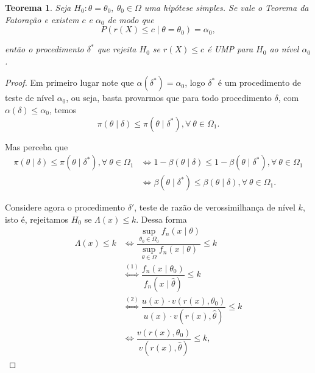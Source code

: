 \documentclass{article}
\newtheorem{theorem}{Teorema}
\begin{document}
\begin{theorem}\label{teo3}
    Seja $H_0 : \theta = \theta_0, ~\theta_0 \in \Omega$ uma hipótese simples. Se vale o Teorema da Fatoração e existem $c$ e $\alpha_0$ de modo que
    \[P(r(X) \leq c \mid \theta = \theta_0) = \alpha_0,\]
    
    \noindent então o procedimento $\delta^*$ que rejeita $H_0$ se $r(X) \leq c$ é UMP para $H_0$ ao nível $\alpha_0$.
\end{theorem}

\begin{proof}
    Em primeiro lugar note que $\alpha(\delta^*) = \alpha_0$, logo $\delta^*$ é um procedimento de teste de nível $\alpha_0$, ou seja, basta provarmos que para todo procedimento $\delta$, com $\alpha(\delta) \leq \alpha_0$, temos
    \[\pi(\theta \mid \delta) \leq \pi(\theta \mid \delta^*), \forall ~\theta \in \Omega_1.\]
    
    Mas perceba que
    \begin{equation*}
        \begin{split}
            \pi(\theta \mid \delta) \leq \pi(\theta \mid \delta^*), \forall ~\theta \in \Omega_1 & \iff 1 - \beta(\theta \mid \delta) \leq 1 - \beta(\theta \mid \delta^*), \forall ~\theta \in \Omega_1 \\
            & \iff \beta(\theta \mid \delta^*) \leq \beta(\theta \mid \delta), \forall ~\theta \in \Omega_1.
        \end{split}
    \end{equation*}
    
    Considere agora o procedimento $\delta'$, teste de razão de verossimilhança de nível $k$, isto é, rejeitamos $H_0$ se $\Lambda(x) \leq k$. Dessa forma
    \begin{equation*}
        \begin{split}
            \Lambda(x) \leq k & \iff \dfrac{\sup_{\theta_0 \in \Omega_0} f_n(x \mid \theta)}{\sup_{\theta \in \Omega} f_n(x \mid \theta)} \leq k \\
            & \overset{(1)}{\iff} \dfrac{f_n\left(x \mid \theta_0\right)}{f_n\left(x \mid \hat{\theta}\right)} \leq k \\
            & \overset{(2)}{\iff} \dfrac{u(x)\cdot v\left(r(x), \theta_0\right)}{u(x)\cdot v\left(r(x), \hat{\theta}\right)} \leq k \\
            & \iff \dfrac{v\left(r(x), \theta_0\right)}{v\left(r(x), \hat{\theta}\right)} \leq k,
        \end{split}
    \end{equation*}
    

\end{proof}
\end{document}
